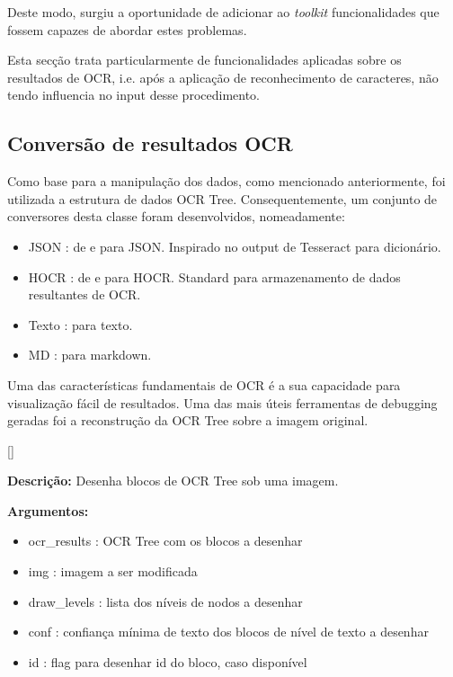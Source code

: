 Deste modo, surgiu a oportunidade de adicionar ao \textit{toolkit} funcionalidades que fossem capazes de abordar estes problemas.

Esta secção trata particularmente de funcionalidades aplicadas sobre os resultados de OCR, i.e. após a aplicação de reconhecimento de caracteres, não tendo influencia no input desse procedimento.


\subsection{Conversão de resultados OCR}
\label{ocr_results_conversion}

Como base para a manipulação dos dados, como mencionado anteriormente, foi utilizada a estrutura de dados OCR Tree. Consequentemente, um conjunto de conversores desta classe foram desenvolvidos, nomeadamente:

\begin{itemize}
	\item JSON : de e para JSON. Inspirado no output de Tesseract para dicionário.
	\item HOCR : de e para HOCR. Standard para armazenamento de dados resultantes de OCR.
	\item Texto : para texto.
	\item MD : para markdown.
\end{itemize}


\label{contribution_debugging}

Uma das características fundamentais de OCR é a sua capacidade para visualização fácil de resultados. Uma das mais úteis ferramentas de debugging geradas foi a reconstrução da OCR Tree sobre a imagem original.

[\normalsize]

\textbf{Descrição:} Desenha blocos de OCR Tree sob uma imagem.

\textbf{Argumentos:}
\begin{itemize}\setlength\itemsep{-0.3em}
	\item ocr\_results : OCR Tree com os blocos a desenhar
	\item img : imagem a ser modificada
	\item draw\_levels : lista dos níveis de nodos a desenhar
	\item conf : confiança mínima de texto dos blocos de nível de texto a desenhar
	\item id : flag para desenhar id do bloco, caso disponível
\end{itemize}

